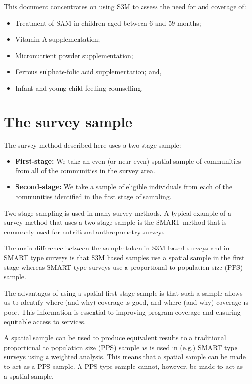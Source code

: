 \documentclass[12pt,a4paper]{book}
\theoremstyle{definition}
\theoremstyle{definition}
\theoremstyle{definition}
\theoremstyle{remark}
\begin{document}
This document concentrates on using S3M to assess the need for and
coverage of:

\begin{itemize}
\item
  Treatment of SAM in children aged between 6 and 59 months;
\item
  Vitamin A supplementation;
\item
  Micronutrient powder supplementation;
\item
  Ferrous sulphate-folic acid supplementation; and,
\item
  Infant and young child feeding counselling.
\end{itemize}

\hypertarget{sample}{%
\chapter{The survey sample}\label{sample}}

The survey method described here uses a two-stage sample:

\begin{itemize}
\item
  \textbf{First-stage:} We take an even (or near-even) spatial sample of
  communities from all of the communities in the survey area.
\item
  \textbf{Second-stage:} We take a sample of eligible individuals from
  each of the communities identified in the first stage of sampling.
\end{itemize}

Two-stage sampling is used in many survey methods. A typical example of
a survey method that uses a two-stage sample is the SMART method that is
commonly used for nutritional anthropometry surveys.

The main difference between the sample taken in S3M based surveys and in
SMART type surveys is that S3M based samples use a spatial sample in the
first stage whereas SMART type surveys use a proportional to population
size (PPS) sample.

The advantages of using a spatial first stage sample is that such a
sample allows us to identify where (and why) coverage is good, and where
(and why) coverage is poor. This information is essential to improving
program coverage and ensuring equitable access to services.

A spatial sample can be used to produce equivalent results to a
traditional proportional to population size (PPS) sample as is used in
(e.g.) SMART type surveys using a weighted analysis. This means that a
spatial sample can be made to act as a PPS sample. A PPS type sample
cannot, however, be made to act as a spatial sample.
\end{document}
